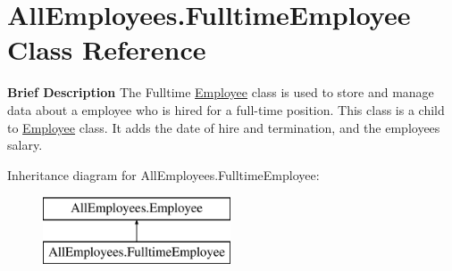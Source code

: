 \hypertarget{class_all_employees_1_1_fulltime_employee}{}\section{All\+Employees.\+Fulltime\+Employee Class Reference}
\label{class_all_employees_1_1_fulltime_employee}


{\bfseries Brief Description} The Fulltime \hyperlink{class_all_employees_1_1_employee}{Employee} class is used to store and manage data about a employee who is hired for a full-\/time position. This class is a child to \hyperlink{class_all_employees_1_1_employee}{Employee} class. It adds the date of hire and termination, and the employees salary.  


Inheritance diagram for All\+Employees.\+Fulltime\+Employee\+:\begin{figure}[H]
\begin{center}
\leavevmode
\includegraphics[height=2.000000cm]{class_all_employees_1_1_fulltime_employee}
\end{center}
\end{figure}
